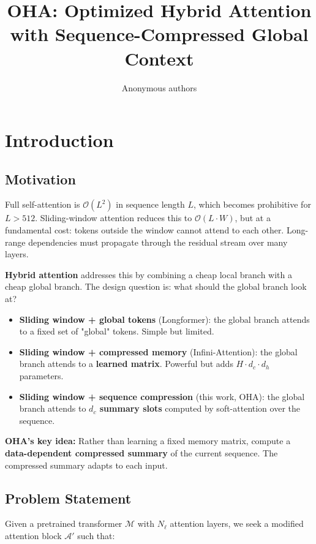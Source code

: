 \title{\textbf{OHA: Optimized Hybrid Attention with Sequence-Compressed Global Context}}

\author{Anonymous authors}



\section{Introduction}

\subsection{Motivation}

Full self-attention is $\mathcal{O}(L^2)$ in sequence length $L$, which 
becomes prohibitive for $L > 512$. Sliding-window attention reduces this to 
$\mathcal{O}(L \cdot W)$, but at a fundamental cost: tokens outside the window 
cannot attend to each other. Long-range dependencies must propagate through 
the residual stream over many layers.

\textbf{Hybrid attention} addresses this by combining a cheap local branch with 
a cheap global branch. The design question is: what should the global branch 
look at?

\begin{itemize}
\item \textbf{Sliding window + global tokens} (Longformer): the global branch attends
  to a fixed set of "global" tokens. Simple but limited.
\item \textbf{Sliding window + compressed memory} (Infini-Attention): the global
  branch attends to a \textbf{learned matrix}. Powerful but adds $H \cdot d_c \cdot d_h$
  parameters.
\item \textbf{Sliding window + sequence compression} (this work, OHA): the global
  branch attends to \textbf{$d_c$ summary slots} computed by soft-attention over
  the sequence.

\end{itemize}
\textbf{OHA's key idea:} Rather than learning a fixed memory matrix, compute a 
\textbf{data-dependent compressed summary} of the current sequence. The compressed 
summary adapts to each input.

\subsection{Problem Statement}

Given a pretrained transformer $\mathcal{M}$ with $N_\ell$ attention layers, 
we seek a modified attention block $\mathcal{A}'$ such that:

